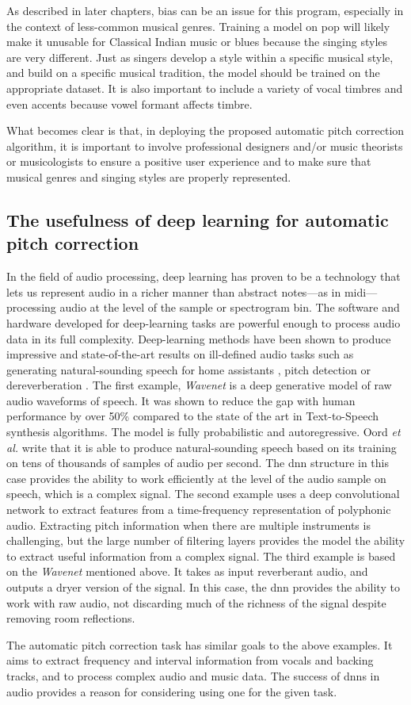 As described in later chapters, bias can be an issue for this program, especially in the context of less-common musical genres. Training a model on pop will likely make it unusable for Classical Indian music or blues because the singing styles are very different. Just as singers develop a style within a specific musical style, and build on a specific musical tradition, the model should be trained on the appropriate dataset. It is also important to include a variety of vocal timbres and even accents because vowel formant affects timbre. 

What becomes clear is that, in deploying the proposed automatic pitch correction algorithm, it is important to involve professional designers and/or music theorists or musicologists to ensure a positive user experience and to make sure that musical genres and singing styles are properly represented.

\subsection{The usefulness of deep learning for automatic pitch correction}
In the field of audio processing, deep learning has proven to be a technology that lets us represent audio in a richer manner than abstract notes---as in \gls{midi}---processing audio at the level of the sample or spectrogram bin. The software and hardware developed for deep-learning tasks are powerful enough to process audio data in its full complexity. Deep-learning methods have been shown to produce impressive and state-of-the-art results on ill-defined audio tasks such as generating natural-sounding speech for home assistants \cite{oord2016wavenet}, pitch detection \cite{bittner2017deep} or dereverberation \cite{su2020hifi}. The first example, \textit{Wavenet} is a deep generative model of raw audio waveforms of speech. It was shown to reduce the gap with human performance by over 50\% compared to the state of the art in Text-to-Speech synthesis algorithms. The model is fully probabilistic and autoregressive. Oord \textit{et al.} write that it is able to produce natural-sounding speech based on its training on tens of thousands of samples of audio per second. The \gls{dnn} structure in this case provides the ability to work efficiently at the level of the audio sample on speech, which is a complex signal. The second example uses a deep convolutional network to extract features from a time-frequency representation of polyphonic audio. Extracting pitch information when there are multiple instruments is challenging, but the large number of filtering layers provides the model the ability to extract useful information from a complex signal. The third example is based on the \textit{Wavenet} mentioned above. It takes as input reverberant audio, and outputs a dryer version of the signal. In this case, the \gls{dnn} provides the ability to work with raw audio, not discarding much of the richness of the signal despite removing room reflections.

The automatic pitch correction task has similar goals to the above examples. It aims to extract frequency and interval information from vocals and backing tracks, and to process complex audio and music data. The success of \gls{dnn}s in audio provides a reason for considering using one for the given task.
